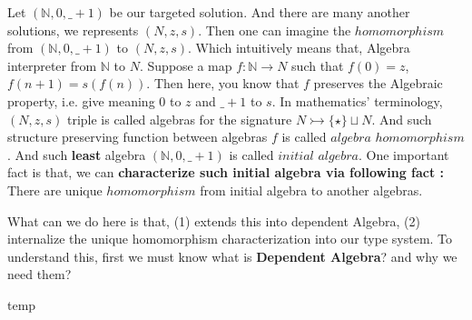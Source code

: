\documentclass[12pt, a4paper, openany, twoside]{book}
\theoremstyle{definition}
\theoremstyle{remark}
\theoremstyle{plain}
\numberwithin{equation}{section}
\begin{document}
\begin{tcolorbox}[breakable, colback=yellow!10!white,colframe=green!75!black,title=Observation 3.4.3.]\hypertarget{obs 3.4.3.}{}
Let $(\mathbb{N}, 0, \_ + 1)$ be our targeted solution. And there are many another solutions, we represents $(N, z, s)$. 
Then one can imagine the $homomorphism$ from $(\mathbb{N}, 0, \_ + 1)$ to $(N, z, s)$. 
Which intuitively means that, Algebra interpreter from $\mathbb{N}$ to $N$. 
Suppose a map $f : \mathbb{N} \rightarrow N$ such that $f(0) = z$, $f(n + 1) = s(f(n))$. 
Then here, you know that $f$ preserves the Algebraic property, i.e. give meaning $0$ to $z$ and $\_ + 1$ to $s$. 
In mathematics' terminology, $(N, z, s)$ triple is called algebras for the signature $N \rightarrowtail \{\star\} \sqcup N$. And such structure preserving function between algebras $f$ is called $algebra$ $homomorphism$. 
And such \textbf{least} algebra $(\mathbb{N}, 0, \_ + 1)$ is called $initial$ $algebra$. 
One important fact is that, we can \textbf{characterize such initial algebra via following fact : } There are unique $homomorphism$ from initial algebra to another algebras. 
\end{tcolorbox}

\noindent What can we do here is that, (1) extends this into dependent Algebra, (2) internalize the unique homomorphism characterization into our type system. 
To understand this, first we must know what is \textbf{Dependent Algebra}? and why we need them? 


\newpage 

temp 
\end{document}
